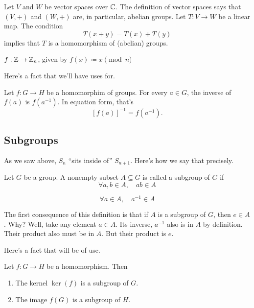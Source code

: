 \begin{example}
    Let $V$ and $W$ be vector spaces over $\mathbb{C}$.
    The definition of vector spaces says that $(V,+)$ and $(W,+)$ are, in particular, abelian groups.
    Let $T:V\to W$ be a linear map.
    The condition
    \[
        T(x+y)=T(x) + T(y)
    \]
    implies that $T$ is a homomorphism of (abelian) groups.
\end{example}

\begin{example}
    $f: \mathbb{Z} \to \mathbb{Z}_n$, given by $f(x) \coloneq x\pmod n$
\end{example}

Here's a fact that we'll have uses for.
\begin{exercise}
    Let $f:G\to H$ be a homomorphim of groups.
    For every $a\in G$, the inverse of $f(a)$ is $f(a^{-1})$.
    In equation form, that's
    \[ [f(a)]^{-1} = f(a^{-1}).\]
\end{exercise}








\subsection{Subgroups}
As we saw above, $S_n$ ``sits inside of'' $S_{n+1}$.
Here's how we say that precisely.

\begin{definition}
    Let $G$ be a group.
    A nonempty subset $A\subseteq G$ is called a subgroup of $G$ if 
    \begin{equation*}\tag{Closure}
        \forall a,b\in A, \quad ab\in A
    \end{equation*}

    \begin{equation*}\tag{Inversion}
        \forall a\in A, \quad a^{-1}\in A
    \end{equation*}
\end{definition}

The first consequence of this definition is that if $A$ is a subgroup of $G$, then $e\in A$.
Why? Well, take any element $a\in A$.
Its inverse, $a^{-1}$ also is in $A$ by definition.
Their product also must be in $A$.
But their product is $e$.

Here's a fact that will be of use.
\begin{proposition}
    Let $f:G\to H$ be a homomorphism.
    Then
    \begin{enumerate}
        \item The kernel $\ker(f)$ is a subgroup of $G$.
        \item The image $f(G)$ is a subgroup of $H$.
    \end{enumerate}
\end{proposition}

